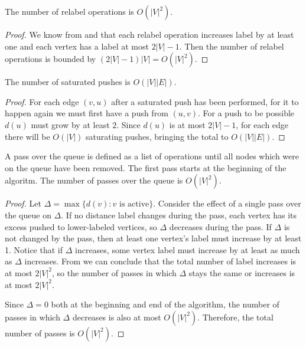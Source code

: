 \begin{theorem}\label{thm:relabel}
The number of relabel operations is $O(|V|^2)$.
\end{theorem}

\begin{proof}
We know from  and  that each relabel operation increases label by at least one and each vertex has a label at most $2|V|-1$. Then the number of relabel operations is bounded by $(2|V|-1)|V| = O(|V|^2)$.
\end{proof}

\begin{theorem}
The number of saturated pushes is $O(|V||E|)$.
\end{theorem}

\begin{proof}
For each edge $(v,u)$ after a saturated push has been performed, for it to happen again we must first have a push from $(u,v)$. For a push to be possible $d(u)$ must grow by at least $2$. Since $d(u)$ is at most $2|V|-1$, for each edge there will be $O(|V|)$ saturating pushes, bringing the total to $O(|V||E|)$.
\end{proof}

\begin{theorem}\label{thm:queue}
A pass over the queue is defined as a list of operations until all nodes which were on the queue have been removed. The first pass starts at the beginning of the algoritm. The number of passes over the queue is $O(|V|^2)$.
\end{theorem}

\begin{proof}
Let $\Delta = \max\{ d(v) \colon v \text{ is active} \}$. Consider the effect of a single pass over the queue on $\Delta$. If no distance label changes during the pass, each vertex has its excess pushed to lower-labeled vertices, so $\Delta$ decreases during the pass. If $\Delta$ is not changed by the pass, then at least one vertex's label must increase by at least 1. Notice that if $\Delta$ increases, some vertex label must increase by at least as much as $\Delta$ increases. From  we can conclude that the total number of label increases is at most $2|V|^2$, so the number of passes in which $\Delta$ stays the same or increases is at most $2|V|^2$.

Since $\Delta = 0$ both at the beginning and end of the algorithm, the number of passes in which $\Delta$ decreases is also at most $O(|V|^2)$. Therefore, the total number of passes is $O(|V|^2)$.
\end{proof}

